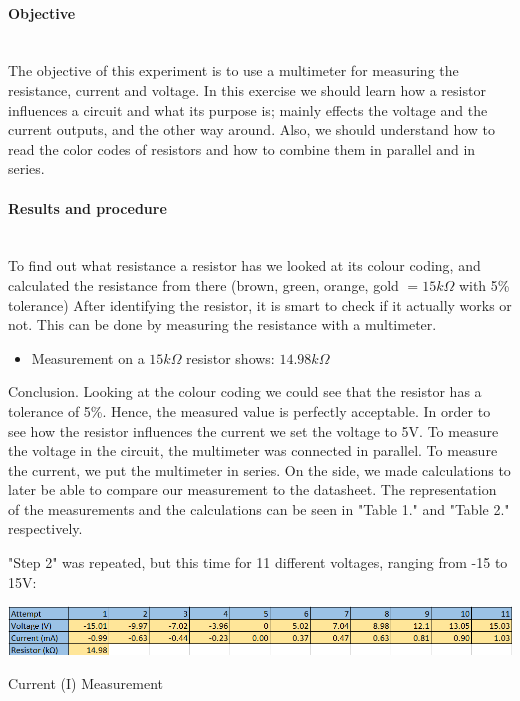\paragraph*{Objective} \hfill \\
The objective of this experiment is to use a multimeter for measuring the resistance, current and voltage. In this exercise we should learn how a resistor influences a circuit and what its purpose is; mainly effects the voltage and the current outputs, and the other way around. Also, we should understand how to read the color codes of resistors and how to combine them in parallel and in series. 

\paragraph*{Results and procedure} \hfill\\
To find out what resistance a resistor has we looked at its colour coding, and calculated the resistance from there (brown, green, orange, gold $= 15k\Omega$ with 5\% tolerance) After identifying the resistor, it is smart to check if it actually works or not. This can be done by measuring the resistance with a multimeter.  
\begin{itemize}
\item Measurement on a $15k\Omega$ resistor shows: $14.98 k\Omega$
\end{itemize}
Conclusion. Looking at the colour coding we could see that the resistor has a tolerance of 5\%. Hence, the measured value is perfectly acceptable. In order to see how the resistor influences the current we set the voltage to 5V. To measure the voltage in the circuit, the multimeter was connected in parallel. To measure the current, we put the multimeter in series. On the side, we made calculations to later be able to compare our measurement to the datasheet. The representation of the measurements and the calculations can be seen in "Table 1." and "Table 2." respectively.
\par "Step 2" was repeated, but this time for 11 different voltages, ranging from -15 to 15V:
\begin{table}[H]
	\centering
	\includegraphics[width=1\textwidth]{./images/Kacper/11.png}
	\caption{Current (I) Measurement}
	\label{Current Measurement}
\end{table}


